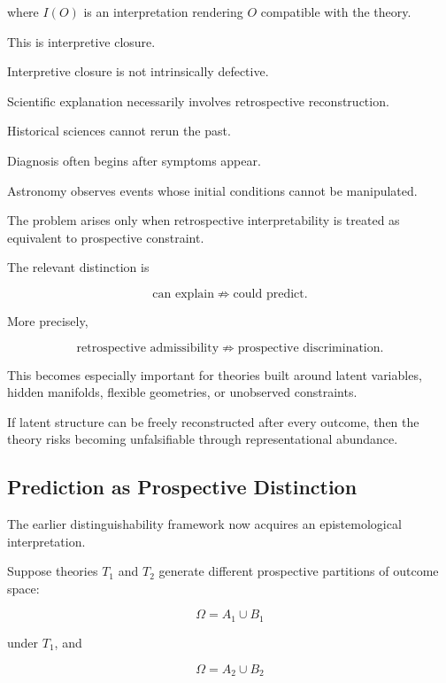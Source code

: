 \documentclass[11pt]{article}
\theoremstyle{remark}
\begin{document}
where $I(O)$ is an interpretation rendering $O$ compatible with the theory.

This is interpretive closure.

Interpretive closure is not intrinsically defective.

Scientific explanation necessarily involves retrospective reconstruction.

Historical sciences cannot rerun the past.

Diagnosis often begins after symptoms appear.

Astronomy observes events whose initial conditions cannot be manipulated.

The problem arises only when retrospective interpretability is treated as equivalent to prospective constraint.

The relevant distinction is

\begin{equation}
\boxed{
\text{can explain}
\not\Rightarrow
\text{could predict}.
}
\end{equation}

More precisely,

\begin{equation}
\boxed{
\text{retrospective admissibility}
\not\Rightarrow
\text{prospective discrimination}.
}
\end{equation}

This becomes especially important for theories built around latent variables, hidden manifolds, flexible geometries, or unobserved constraints.

If latent structure can be freely reconstructed after every outcome, then the theory risks becoming unfalsifiable through representational abundance.

\subsection{Prediction as Prospective Distinction}

The earlier distinguishability framework now acquires an epistemological interpretation.

Suppose theories $T_1$ and $T_2$ generate different prospective partitions of outcome space:

\begin{equation}
\Omega
=
A_1\cup B_1
\end{equation}

under $T_1$, and

\begin{equation}
\Omega
=
A_2\cup B_2
\end{equation}
\end{document}
